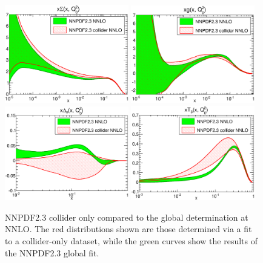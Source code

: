 \begin{figure}[ht]
\centering
\includegraphics[width=0.48\textwidth]{6-LHCimpact/figs/xSinglet_Q_2_log-23-vs-23coll-nnlo.eps}
\includegraphics[width=0.48\textwidth]{6-LHCimpact/figs/xg_Q_2_log-23-vs-23coll-nnlo.eps}\\
\includegraphics[width=0.48\textwidth]{6-LHCimpact/figs/xDs_Q_2_log-23-vs-23coll-nnlo.eps}
\includegraphics[width=0.48\textwidth]{6-LHCimpact/figs/xT3_Q_2_log-23-vs-23coll-nnlo.eps}
\caption[NNPDF2.3 collider only compared to the global determination at NNLO]{NNPDF2.3 collider only compared to the global determination at NNLO. The red distributions shown are those determined via a fit to a collider-only dataset, while the green curves show the results of the NNPDF2.3 global fit.}
\label{fig:23vs23coll}
\end{figure}

